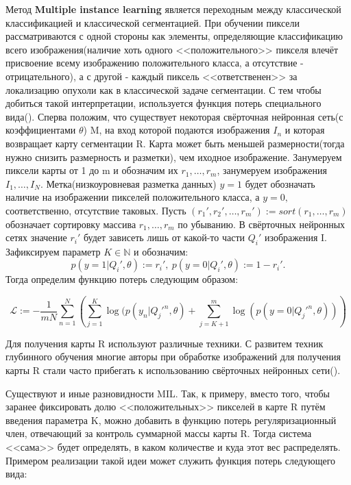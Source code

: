 Метод {\bf Multiple instance learning} является переходным между классической классификацией и классической сегментацией.
При обучении пиксели рассматриваются с одной стороны как элементы, определяющие классификацию всего изображения(наличие хоть одного
<<положительного>> пикселя влечёт присвоение всему изображению положительного класса, а отсутствие - отрицательного), а с другой - 
каждый пиксель <<ответственен>> за локализацию опухоли как в классической задаче сегментации. С тем чтобы добиться такой интерпретации, 
используется функция потерь специального вида(\cite{zhu_deep_2016}). Сперва положим, что существует некоторая свёрточная нейронная сеть(с коэффициентами $\theta$) M, на вход которой подаются изображения $I_n$ и которая возвращает карту сегментации R. Карта может быть меньшей размерности(тогда нужно снизить размерность и разметки), чем иходное изображение. Занумеруем пиксели карты  от 1 до m и обозначим их $r_1, \dots, r_m$, занумеруем изображения $I_1, \dots, I_N$. Метка(низкоуровневая разметка данных) $y=1$ будет обозначать наличие на изображении пикселей положительного класса, а $y = 0,$  соответственно, отсутствие таковых. Пусть $(r_1', r_2',\dots, r_m') := sort(r_1, \dots, r_m )$ обозначает сортировку массива $r_1, \dots, r_m$ по убыванию. В свёрточных нейронных сетях значение $r_i'$ будет зависеть лишь от какой-то части $Q_i'$ изображения I. Зафиксируем параметр $K\in\mathbb{N}$ и обозначим: 
$$p(y=1|Q_i', \theta):= r_i', ~p(y=0|Q_i', \theta):= 1 - r_i'.$$ Тогда определим функцию потерь следующим образом:

\begin{equation}
  \label{eq:equation1}
  \mathcal{L} := -\frac{1}{mN}\sum_{n=1}^N\left( \sum_{j=1}^K\log(p(y_n|Q_{j}'^n,\theta)+\sum_{j=K+1}^m\log(p(y=0|Q_{j}'^n,\theta))\right)
\end{equation}


Для получения карты R используют различные техники.  С развитем техник глубинного обучения многие авторы при обработке изображений 
для получения карты R стали часто прибегать к использованию свёрточных нейронных сети(\cite{quellec_multiple-instance_2017}).

Существуют и иные разновидности MIL. Так, к примеру, вместо того, чтобы заранее фиксировать долю <<положительных>> пикселей в карте R путём введения параметра K, можно добавить в функцию потерь регуляризационный член, отвечающий за контроль суммарной массы карты R. Тогда система <<сама>> будет определять, в каком количестве и куда этот вес распределять. Примером реализации такой идеи может служить функция потерь следующего вида: 


